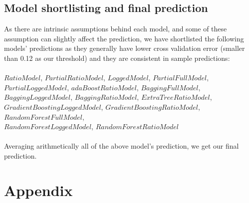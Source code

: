 \documentclass{article}
\begin{document}
\subsection{Model shortlisting and final prediction}
As there are intrinsic assumptions behind each model, and some of these assumption can slightly affect the prediction, we have shortlisted the following models' predictions as they generally have lower cross validation error (smaller than 0.12 as our threshold) and they are consistent in sample predictions:\\\\
$Ratio Model$, $Partial Ratio Model$, $Logged Model$, $Partial Full Model$, $Partial Logged Model$, $adaBoost Ratio Model$, $Bagging Full Model$, $Bagging Logged Model$, $Bagging Ratio Model$, $Extra Tree Ratio Model$, \\$Gradient Boosting Logged Model$, $Gradient Boosting Ratio Model$, $Random Forest Full Model$, \\$Random Forest Logged Model$, $Random Forest Ratio Model$\\\\
Averaging arithmetically all of the above model's prediction, we get our final prediction.





\newpage
\section{Appendix}
\end{document}
